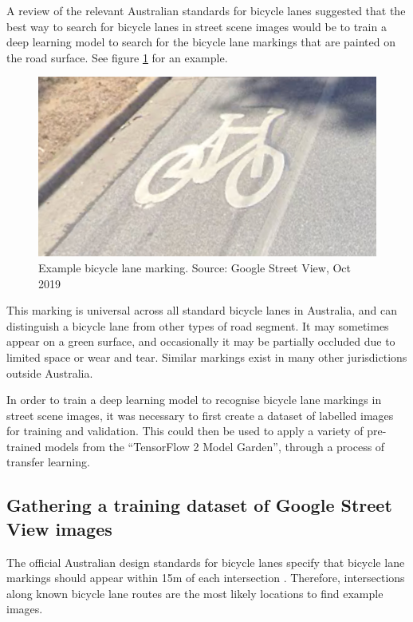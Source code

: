 \documentclass[11pt,twoside]{report}
\begin{document}
A review of the relevant Australian standards for bicycle lanes \cite{standards} suggested that the best way to search for bicycle lanes in street scene images would be to train a deep learning model to search for the bicycle lane markings that are painted on the road surface.  See figure \ref{fig:symbol} for an example.  

\begin{figure}[h]
\centering
\includegraphics{f001_symbol.png}
\caption{Example bicycle lane marking.  Source: Google Street View, Oct 2019}
\label{fig:symbol}
\end{figure}

This marking is universal across all standard bicycle lanes in Australia, and can distinguish a bicycle lane from other types of road segment.  It may sometimes appear on a green surface, and occasionally it may be partially occluded due to limited space or wear and tear.  Similar markings exist in many other jurisdictions outside Australia.

In order to train a deep learning model to recognise bicycle lane markings in street scene images, it was necessary to first create a dataset of labelled images for training and validation.  This could then be used to apply a variety of pre-trained models from the ``TensorFlow 2 Model Garden'', through a process of transfer learning.

\subsection{Gathering a training dataset of Google Street View images}

The official Australian design standards for bicycle lanes specify that bicycle lane markings should appear within 15m of each intersection \cite{standards}.  Therefore, intersections along known bicycle lane routes are the most likely locations to find example images.
\end{document}
